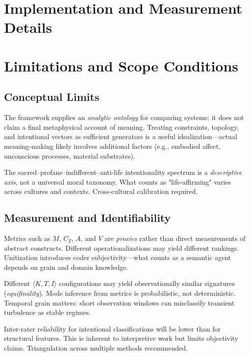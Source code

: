 \documentclass[12pt]{article}
\begin{document}
\section{Implementation and Measurement Details}

\section{Limitations and Scope Conditions}

\subsection{Conceptual Limits}

The framework supplies an \textit{analytic ontology} for comparing systems; it does not claim a final metaphysical account of meaning. Treating constraints, topology, and intentional vectors as sufficient generators is a useful idealization—actual meaning-making likely involves additional factors (e.g., embodied affect, unconscious processes, material substrates).

The sacred–profane–indifferent–anti-life intentionality spectrum is a \textit{descriptive axis}, not a universal moral taxonomy. What counts as "life-affirming" varies across cultures and contexts. Cross-cultural calibration required.

\subsection{Measurement and Identifiability}

Metrics such as $M$, $C_T$, $A$, and $V$ are \textit{proxies} rather than direct measurements of abstract constructs. Different operationalizations may yield different rankings. Unitization introduces coder subjectivity—what counts as a semantic agent depends on grain and domain knowledge.

Different $\langle K, T, I \rangle$ configurations may yield observationally similar signatures (\textit{equifinality}). Mode inference from metrics is probabilistic, not deterministic. Temporal grain matters: short observation windows can misclassify transient turbulence as stable regimes.

Inter-rater reliability for intentional classifications will be lower than for structural features. This is inherent to interpretive work but limits objectivity claims. Triangulation across multiple methods recommended.
\end{document}
